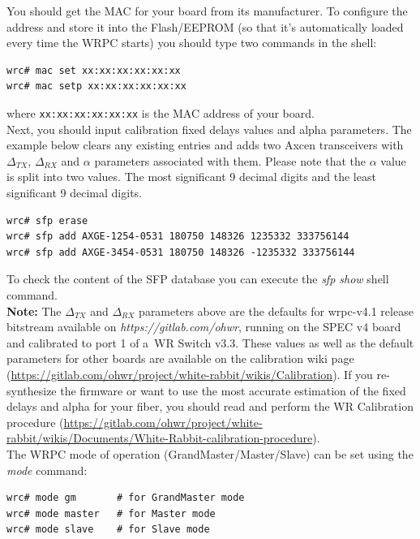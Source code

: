 \documentclass[a4paper, 12pt]{article}
\renewcommand{\_}{\underscore\allowbreak}
\begin{document}
You should get the MAC for your board from its manufacturer. To configure the
address and store it into the Flash/EEPROM (so that it's automatically loaded
every time the WRPC starts) you should type two commands in the shell:
\begin{lstlisting}
wrc# mac set xx:xx:xx:xx:xx:xx
wrc# mac setp xx:xx:xx:xx:xx:xx
\end{lstlisting}
where \texttt{xx:xx:xx:xx:xx:xx} is the MAC address of your board.\\

Next, you should input calibration fixed delays values and alpha parameters. The
example below clears any existing entries and adds two Axcen transceivers with
$\Delta_{TX}$, $\Delta_{RX}$ and $\alpha$ parameters associated with them.
Please note that the $\alpha$ value is split into two values. The most
significant 9 decimal digits and the least significant 9 decimal digits.

\begin{lstlisting}
wrc# sfp erase
wrc# sfp add AXGE-1254-0531 180750 148326 1235332 333756144
wrc# sfp add AXGE-3454-0531 180750 148326 -1235332 333756144
\end{lstlisting}

To check the content of the SFP database you can execute the \textit{sfp show}
shell command.\\

\noindent\textbf{Note:} The $\Delta_{TX}$ and $\Delta_{RX}$ parameters above are
the defaults for wrpc-v4.1 release bitstream available on
\textit{https://gitlab.com/ohwr},
running on the SPEC v4 board and calibrated to port 1 of a~WR Switch
v3.3. These values as well as the default parameters for other boards are
available on the calibration wiki page
(\url{https://gitlab.com/ohwr/project/white-rabbit/wikis/Calibration}). If you
re-synthesize the firmware or want to use the most accurate estimation of
the fixed delays and alpha for your fiber, you should read and perform the WR
Calibration procedure
(\url{https://gitlab.com/ohwr/project/white-rabbit/wikis/Documents/White-Rabbit-calibration-procedure}).\\

The WRPC  mode of operation (GrandMaster/Master/Slave) can be set
using the \textit{mode} command:

\begin{lstlisting}
wrc# mode gm       # for GrandMaster mode
wrc# mode master   # for Master mode
wrc# mode slave    # for Slave mode
\end{lstlisting}
\end{document}

